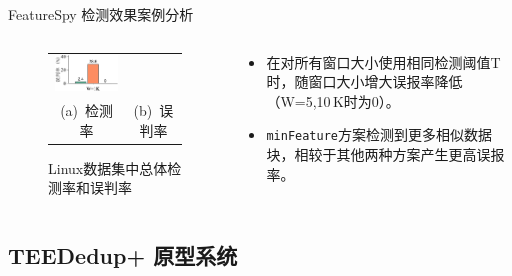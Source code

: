 \documentclass{beamer}
\newcommand{\sysnameF}{FeatureSpy }
\newcommand{\prototype}{TEEDedup+ }
\begin{document}
\begin{frame}{\sysnameF 检测效果案例分析}
\begin{columns}
\begin{column}{.6\textwidth}
\begin{figure}[!htb]
\begin{tabular}{@{\ }c@{\ }c}
                    \includegraphics[width=0.33\linewidth]{../pic/featurespy/plot/detection/overall/falsePositiveLinux.pdf}   \\
                    \mbox{\small (a) 检测率}                                                                                &
                    \mbox{\small (b) 误判率}                                                                                  \\
                \end{tabular}
                \caption{Linux数据集中总体检测率和误判率}
                \label{fig:featurespy-expDetectionOverallFalsePositive}
            \end{figure}
        \end{column}
        \begin{column}{.4\textwidth}
            \begin{itemize}
                \item 在对所有窗口大小使用相同检测阈值T时，随窗口大小增大误报率降低（W=5,10\,K时为0）。
                \item {\tt minFeature}方案检测到更多相似数据块，相较于其他两种方案产生更高误报率。
            \end{itemize}
        \end{column}
    \end{columns}
\end{frame}

\subsection{\prototype 原型系统}
\end{document}
